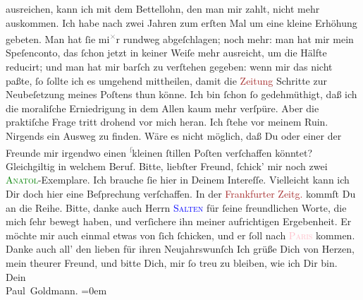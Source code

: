                ausreichen, kann ich mit dem Bettellohn, den man mir zahlt, nicht mehr auskommen. Ich
               habe nach zwei Jahren zum erſten Mal um eine kleine Erhöhung gebeten. Man hat ſie mi\substVorne{}\textsuperscript{\textcolor{gray}{×}}\substDazwischen{}r\substHinten{} rundweg abgeſchlagen; noch mehr: man hat mir mein Speſenconto, das ſchon
               jetzt in keiner Weiſe mehr ausreicht, um die Hälfte reducirt; und man hat mir barſch
                  {\pb}zu verſtehen gegeben: wenn mir das nicht paßte,
               ſo ſollte ich es umgehend mittheilen, damit die \textcolor{brown}{Zeitung}{} Schritte zur Neubeſetzung meines Poſtens thun könne.
               Ich bin ſchon ſo gedehmüthigt, daß  ich die moraliſche Erniedrigung in dem Allen kaum mehr verſpüre. Aber die
               praktiſche Frage tritt drohend vor mich heran. Ich ſtehe vor meinem Ruin. Nirgends
               ein Ausweg zu finden. Wäre es nicht möglich, daß Du oder einer der Freunde mir
               irgendwo einen \substVorne{}\textsuperscript{\textcolor{gray}{ſ}}\substDazwischen{}k\substHinten{}leinen ſtillen Poſten verſchaffen könntet? Gleichgiltig in welchem Beruf.\pend
           \pstart
           {\pb}Bitte, liebſter Freund, ſchick’ mir noch zwei \textsc{\textcolor{green}{Anatol}{}\ledrightnote{\textcolor{green}{Anatol}}}-Exemplare. Ich brauche ſie hier in Deinem Intereſſe. Vielleicht kann ich Dir
               doch hier eine Beſprechung verſchaffen. In der \textcolor{brown}{Frankfurter Zeitg.}{}\ledrightnote{\textcolor{brown}{Frankfurter Zeitung}} kommſt Du \label{K_L02605-2v}\label{K_L02605-2h}
               an die Reihe.\pend
           \pstart
           Bitte, danke auch Herrn \textsc{\textcolor{blue}{Salten}{}\ledrightnote{\textcolor{blue}{Felix Salten}}} für ſeine freundlichen Worte, die mich ſehr bewegt haben, und verſichere ihn
               meiner aufrichtigen Ergebenheit. Er möchte mir auch einmal etwas {\pb}von ſich ſchicken, und er ſoll nach \textsc{\textcolor{pink}{Paris}{}\ledrightnote{\textcolor{pink}{Paris}}} kommen. Danke auch all’ den lieben \label{K_L02605-1v}\label{K_L02605-1h} für ihren Neujahrswunſch\pend
           \pstart
           Ich grüße Dich von Herzen, mein theurer Freund, und bitte Dich, mir ſo treu zu
               bleiben, wie ich Dir bin. {\\[\baselineskip]}Dein {\\[\baselineskip]}\spacefill\mbox{Paul Goldmann.}\pend
           \leftskip=0em{}\endnumbering{}  
      